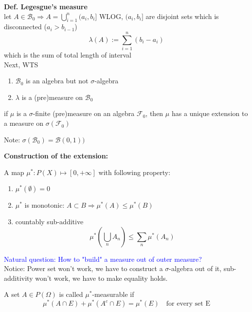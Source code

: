 \textbf{Def. Legesgue's measure}  \\
let $A \in \mathcal{B}_0 \Rightarrow A = \bigcup\limits_{i = 1}^n (a_i, b_i]$ WLOG, $(a_i, b_i]$ are disjoint sets which is disconnected ($a_i > b_{i-1}$)
\begin{equation*}
    \lambda(A) := \sum\limits_{i=1}^n (b_i-a_i)
\end{equation*} which is the sum of total length of interval \\
Next, WTS \begin{enumerate}
    \item $\mathcal{B}_0$ is an algebra but not $\sigma$-algebra
    \item $\lambda$ is a (pre)measure on $\mathcal{B}_0$
\end{enumerate}
\newpage
\begin{thm}\label{Cara}
if $\mu$ is a $\sigma$-finite (pre)measure on an algebra $\mathcal{F}_0$, then $\mu$ has a unique extension to a measure on $\sigma(\mathcal{F}_0)$
\end{thm}
\begin{cor}
Note: $\sigma(\mathcal{B}_0) = \mathcal{B}(0,1))$
\end{cor}
\textbf{Construction of the extension: } \\
\begin{dfn} A map $\mu^*: P(X)\mapsto [0,+\infty]$ with following property:
\begin{enumerate}
    \item $\mu^*(\emptyset) = 0$
    \item $\mu^*$ is monotonic: $A\subset B\Rightarrow \mu^*(A)\leq \mu^*(B) $
    \item countably sub-additive 
    \begin{equation*}
        \mu^*(\bigcup\limits_{n}A_n) \leq \sum\limits_n \mu^*(A_n)
    \end{equation*}
\end{enumerate}
\end{dfn}
\textcolor{blue}{Natural question: How to "build" a measure out of outer measure?} \\
Notice: Power set won't work, we have to construct a $\sigma$-algebra out of it, sub-additivity won't work, we have to make equality holds. \\
\begin{dfn}
A set $A\in P(\Omega)$ is called $\mu^*$-measurable if 
\begin{equation*}
    \mu^*(A\cap E) + \mu^*(A^c \cap E) = \mu^*(E) \quad \text{for every set E}
\end{equation*}
\end{dfn}

